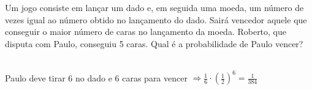 \begin{ex}
Um jogo consiste em lançar um dado e, em seguida uma moeda, um número de vezes igual ao número obtido no lançamento do dado. Sairá vencedor aquele que conseguir o maior número de caras no lançamento da moeda. Roberto, que disputa com Paulo, conseguiu 5 caras. Qual é a probabilidade de Paulo vencer?
  \begin{sol}
    \phantom{A} \\
    Paulo deve tirar 6 no dado e 6 caras para vencer \hspace{0,4cm} $\Longrightarrow \frac{1}{6}\cdot(\frac{1}{2})^6=\frac{1}{384}$
  \end{sol}
\end{ex}